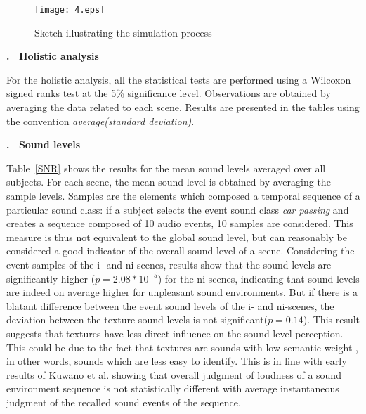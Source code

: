 \documentclass[12pt, titlepage, reqno]{article} %
\renewcommand{\section}[1]{\medskip \addtocounter{section}{1}\raggedright 
     \textbf{\Roman{section}. \ #1}\medskip \setcounter{subsection}{0}
    \setlength{\parindent}{5ex}
 }
\renewcommand{\subsection}[1]{\medskip \addtocounter{subsection}{1}\raggedright
    \textbf{\Alph{subsection}. \ #1} \medskip \setcounter{subsubsection}{0}\setlength{\parindent}{5ex}
}
\begin{document}

\begin{figure}[t]
\begin{center}
\texttt{[image: 4.eps]}
  \caption{\label{task}Sketch illustrating the simulation process}
  \end{center}
\end{figure}

\section{Holistic analysis }

For the holistic analysis, all the statistical tests are performed using a Wilcoxon signed ranks test at the 5\% significance level. Observations are obtained by averaging the data related to each scene. Results are presented in the tables using the convention \textit{average(standard deviation)}.

\subsection{Sound levels}

Table~\ref{SNR} shows the results for the mean sound levels averaged over all subjects. For each scene, the mean sound level is obtained by averaging the sample levels. Samples are the elements which composed a temporal sequence of a particular sound class: if a subject selects the event sound class \textit{car passing} and creates a sequence  composed of 10 audio events, 10 samples are considered. This measure is thus not equivalent to the global sound level, but  can reasonably be considered a good indicator of the overall sound level of a scene.
Considering the event samples of the i- and ni-scenes, results show that the sound levels are significantly higher ($p=2.08*10^{-5}$) for the ni-scenes, indicating that sound levels are indeed on average higher for unpleasant sound environments. But if there is a blatant difference between the event sound levels of the i- and ni-scenes, the deviation between the texture sound levels is not significant($p=0.14$). This result suggests that textures have less direct influence on the sound level perception. This could be due to the fact that textures are sounds with low semantic weight \cite{saint-arnaud_classification_1995}, in other words, sounds which are less easy to identify. This is in line with early results of Kuwano et al. \cite{kuwano_memory_2003-1} showing that overall judgment of loudness of a sound environment sequence is not statistically different with average instantaneous judgment of the recalled sound events of the sequence.   
\end{document}
